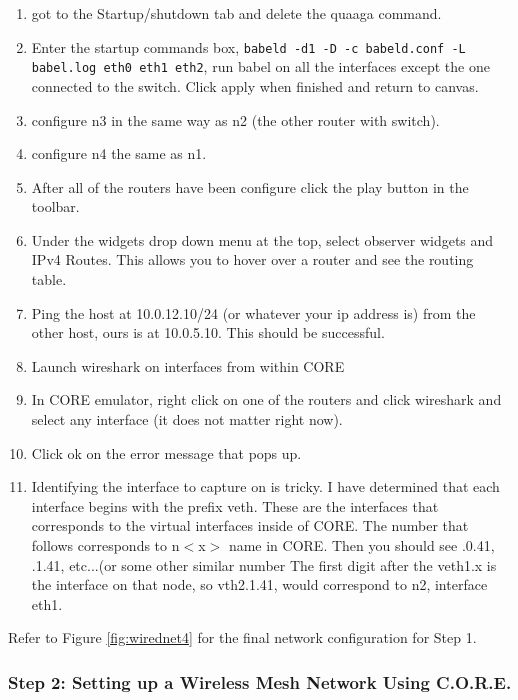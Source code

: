 \documentclass[main.tex]{subfiles}
\begin{document}
\begin{enumerate}[noitemsep,label=$\bullet$,leftmargin=20mm,labelsep=0.5cm]
\item got to the Startup/shutdown tab and delete the quaaga command.
\item Enter the startup commands box, \texttt{babeld -d1 -D -c babeld.conf -L babel.log eth0 eth1 eth2}, run babel on all the interfaces except the one connected to the switch.  Click apply when finished and return to canvas.

\item configure n3 in the same way as n2 (the other router with switch).
\item configure n4 the same as n1.
\item After all of the routers 
have been configure click the play button in the toolbar.
\item Under the widgets drop down menu at the top, select observer widgets and IPv4 Routes.  This allows you to hover over a router and see the routing table.

\item Ping the host at 10.0.12.10/24 (or whatever your ip address is) from the other host, ours is at 10.0.5.10.  This should be successful.


\item Launch wireshark on interfaces from within CORE
\item In CORE emulator, right click on one of the routers and click wireshark and select any interface (it does not matter right now).

\item Click ok on the error message that pops up.

\item Identifying the interface to capture on is tricky.  I have determined that each interface begins with the prefix veth.  These are the interfaces that corresponds to the virtual interfaces inside of CORE.  The number that follows corresponds to n$<$x$>$ name in CORE.  Then you should see .0.41, .1.41, etc...(or some other similar number  The first digit after the veth1.x is the interface on that node, so vth2.1.41, would correspond to n2, interface eth1. 

\end{enumerate}

\noindent Refer to Figure \ref{fig:wirednet4} for the final network configuration for Step 1.

\subsubsection{Step 2:  Setting up a Wireless Mesh Network Using C.O.R.E.}
\end{document}
